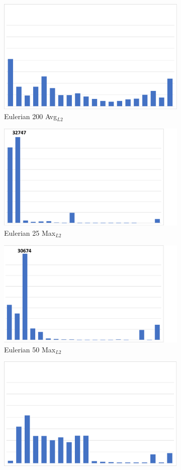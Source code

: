 \begin{figure}
\begin{subfigure}{0.24\textwidth}
\centering
\includegraphics[width=0.7\linewidth]{results/nyx/Eul200_AvgL2.pdf}
\caption{Eulerian 200 Avg$_{L2}$}
\end{subfigure}
\begin{subfigure}{0.24\textwidth}
\centering
\includegraphics[width=0.7\linewidth, trim={0cm 0cm 2.5cm 0cm}, clip]{results/nyx/Eul25_Max.pdf}
\caption{Eulerian 25 Max$_{L2}$}
\end{subfigure}
\hspace{1mm}
\begin{subfigure}{0.24\textwidth}
\centering
\includegraphics[width=0.7\linewidth, trim={0cm 0cm 2.5cm 0cm}, clip]{results/nyx/Eul50_Max.pdf}
\caption{Eulerian 50 Max$_{L2}$}
\end{subfigure}
\hspace{1mm}
\begin{subfigure}{0.24\textwidth}
\centering
\includegraphics[width=0.7\linewidth]{results/nyx/Eul100_Max.pdf}

\end{subfigure}
\end{figure}
